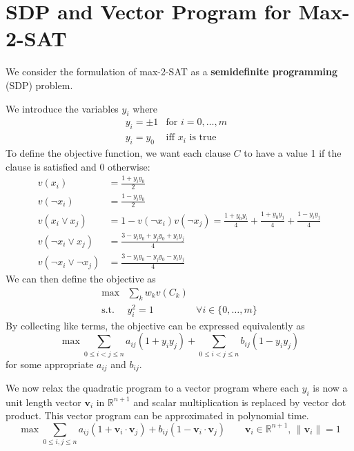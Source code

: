 



\section{SDP and Vector Program for Max-2-SAT}

We consider the formulation of max-2-SAT as a \textbf{semidefinite programming} (SDP) problem.

We introduce the variables $y_i$ where
$$
\begin{array}{ll}
    y_i = \pm 1 & \text{for $i = 0,\ldots,m$ } \\
    y_i = y_0 & \text{iff $x_i$ is true}
\end{array}
$$
To define the objective function, we want each clause $C$ to have a value 1 if the clause is satisfied and 0 otherwise:
$$
\begin{aligned}
    v(x_i) &= \frac{1 + y_i y_0}{2} \\
    v(\neg x_i) &= \frac{1 - y_i y_0}{2} \\
    v(x_i \lor x_j) &= 1 - v(\neg x_i) v(\neg x_j) = \frac{1 + y_0y_i}{4} + \frac{1 + y_0y_j}{4} + \frac{1 - y_iy_j}{4} \\
    v(\neg x_i \lor x_j) &= \frac{3 - y_i y_0 + y_jy_0 + y_iy_j}{4} \\
    v(\neg x_i \lor \neg x_j) &= \frac{3 - y_iy_0 - y_jy_0 - y_iy_j}{4}
\end{aligned}
$$
We can then define the objective as
$$
\begin{array}{lll}
    \max & \sum_{k} w_k v(C_k) \\
    \text{s.t.} & y_i^2 = 1 & \forall i \in \{0,\ldots,m\}
\end{array}
$$
By collecting like terms, the objective can be expressed equivalently as
$$
\max \sum_{0 \leq i < j \leq n} a_{ij} (1 + y_iy_j) + \sum_{0 \leq i < j \leq n} b_{ij} (1 - y_iy_j)
$$
for some appropriate $a_{ij}$ and $b_{ij}$.

We now relax the quadratic program to a vector program where each $y_i$ is now a unit length vector $\mathbf{v}_i$ in $\mathbb{R}^{n+1}$ and scalar multiplication is replaced by vector dot product. This vector program can be approximated in polynomial time.
$$
\max \sum_{0 \leq i,j \leq n} a_{ij} (1 + \mathbf{v}_i \cdot \mathbf{v}_j) + b_{ij} (1 - \mathbf{v}_i \cdot \mathbf{v}_j) \qquad \mathbf{v}_i \in \mathbb{R}^{n+1},\, \lVert \mathbf{v}_i \rVert = 1
$$

